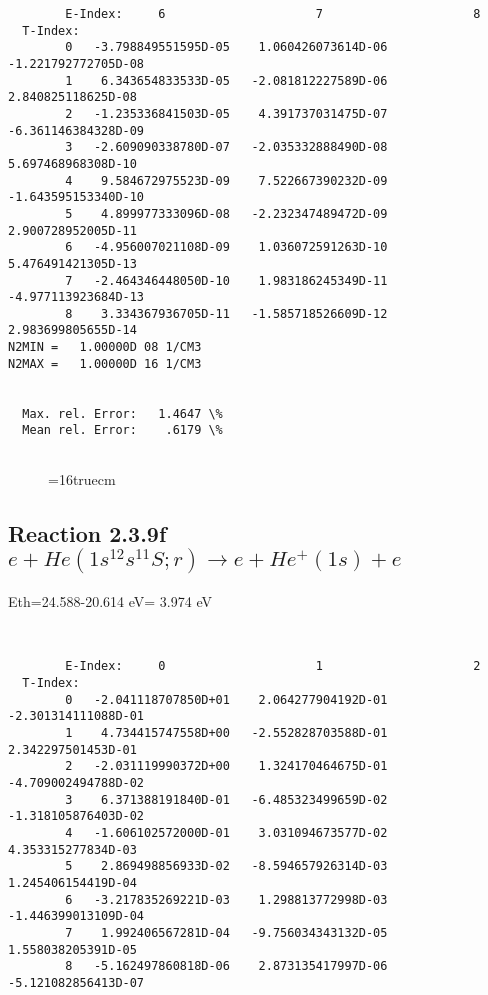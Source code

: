 \documentclass[12pt,dvipdfmx]{article}
\begin{document}
{\begin{small}
\begin{verbatim}
        E-Index:     6                     7                     8
  T-Index:
        0   -3.798849551595D-05    1.060426073614D-06   -1.221792772705D-08
        1    6.343654833533D-05   -2.081812227589D-06    2.840825118625D-08
        2   -1.235336841503D-05    4.391737031475D-07   -6.361146384328D-09
        3   -2.609090338780D-07   -2.035332888490D-08    5.697468968308D-10
        4    9.584672975523D-09    7.522667390232D-09   -1.643595153340D-10
        5    4.899977333096D-08   -2.232347489472D-09    2.900728952005D-11
        6   -4.956007021108D-09    1.036072591263D-10    5.476491421305D-13
        7   -2.464346448050D-10    1.983186245349D-11   -4.977113923684D-13
        8    3.334367936705D-11   -1.585718526609D-12    2.983699805655D-14
N2MIN =   1.00000D 08 1/CM3
N2MAX =   1.00000D 16 1/CM3


  Max. rel. Error:   1.4647 \%
  Mean rel. Error:    .6179 \%


\end{verbatim}\end{small}
\begin{figure} \label{2.3.9e}
\epsfxsize=16truecm
\end{figure}
\newpage

\subsection{
Reaction 2.3.9f  $e + He(1s^12s^11S;r) \rightarrow e + He^+(1s) + e  $
}
Eth=24.588-20.614 eV= 3.974 eV


\begin{small}\begin{verbatim}


        E-Index:     0                     1                     2
  T-Index:
        0   -2.041118707850D+01    2.064277904192D-01   -2.301314111088D-01
        1    4.734415747558D+00   -2.552828703588D-01    2.342297501453D-01
        2   -2.031119990372D+00    1.324170464675D-01   -4.709002494788D-02
        3    6.371388191840D-01   -6.485323499659D-02   -1.318105876403D-02
        4   -1.606102572000D-01    3.031094673577D-02    4.353315277834D-03
        5    2.869498856933D-02   -8.594657926314D-03    1.245406154419D-04
        6   -3.217835269221D-03    1.298813772998D-03   -1.446399013109D-04
        7    1.992406567281D-04   -9.756034343132D-05    1.558038205391D-05
        8   -5.162497860818D-06    2.873135417997D-06   -5.121082856413D-07


\end{verbatim}
\end{small}}
\end{document}
